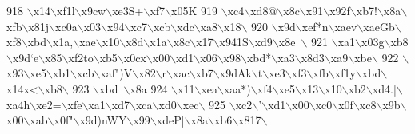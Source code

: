 \begin{DoxyCode}
{{918 \textcolor{stringliteral}{\(\backslash\)x14\(\backslash\)xf1l\(\backslash\)x9cw\(\backslash\)xe3S+\(\backslash\)xf7\(\backslash\)x05K%
919 \textcolor{stringliteral}{\(\backslash\)xc4\(\backslash\)xd8@\(\backslash\)x8c\(\backslash\)x91\(\backslash\)x92f\(\backslash\)xb7!\(\backslash\)x8a\(\backslash\)xfb\(\backslash\)x81j\(\backslash\)xc0a\(\backslash\)x03\(\backslash\)x94\(\backslash\)xc7\(\backslash\)xcb\(\backslash\)xdc\(\backslash\)xa8\(\backslash\)x18\(\backslash\)}
920 \textcolor{stringliteral}{\(\backslash\)x9d\(\backslash\)xef*n\(\backslash\)xaev\(\backslash\)xaeGb\(\backslash\)xf8\(\backslash\)xbd\(\backslash\)x1a,\(\backslash\)xae\(\backslash\)x10\(\backslash\)x8d\(\backslash\)x1a\(\backslash\)x8c\(\backslash\)x17\(\backslash\)x941S\(\backslash\)xd9\(\backslash\)x8e~\(\backslash\)}
921 \textcolor{stringliteral}{\(\backslash\)xa1\(\backslash\)x03g\(\backslash\)xb8\(\backslash\)x9d`e\(\backslash\)x85\(\backslash\)xf2to\(\backslash\)xb5\(\backslash\)x0cx\(\backslash\)x00\(\backslash\)xd1\(\backslash\)x06\(\backslash\)x98\(\backslash\)xbd*\(\backslash\)xa3\(\backslash\)x8d3\(\backslash\)xa9\(\backslash\)xbe\(\backslash\)}
922 \textcolor{stringliteral}{\(\backslash\)x93\(\backslash\)xe5\(\backslash\)xb1\(\backslash\)xcb\(\backslash\)xaf")V\(\backslash\)x82\(\backslash\)r\(\backslash\)xac\(\backslash\)xb7\(\backslash\)x9dAk\(\backslash\)t\(\backslash\)xe3\(\backslash\)xf3\(\backslash\)xfb\(\backslash\)xf1y\(\backslash\)xbd\(\backslash\)x14x<\(\backslash\)xb8\(\backslash\)}
923 \textcolor{stringliteral}{\(\backslash\)xbd~\(\backslash\)x8a%
924 \textcolor{stringliteral}{\(\backslash\)x11\(\backslash\)xea\(\backslash\)xaa*)\(\backslash\)xf4\(\backslash\)xe5\(\backslash\)x13\(\backslash\)x10\(\backslash\)xb2\(\backslash\)xd4.|\(\backslash\)xa4h\(\backslash\)xe2=\(\backslash\)xfe\(\backslash\)xa1\(\backslash\)xd7\(\backslash\)xca\(\backslash\)xd0\(\backslash\)xec\(\backslash\)}
925 \textcolor{stringliteral}{\(\backslash\)xc2\(\backslash\)'\(\backslash\)xd1\(\backslash\)x00\(\backslash\)xc0\(\backslash\)x0f\(\backslash\)xc8\(\backslash\)x9b\(\backslash\)x00\(\backslash\)xab\(\backslash\)x0f"\(\backslash\)x9d)nWY\(\backslash\)x99\(\backslash\)xdeP|\(\backslash\)x8a\(\backslash\)xb6\(\backslash\)x817\(\backslash\)}
}}}}
\end{DoxyCode}
